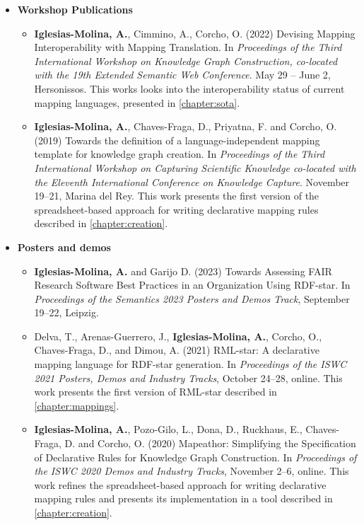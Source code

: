 \begin{itemize}
    \item \textbf{Workshop Publications}
    \begin{itemize}
        \item \textbf{Iglesias-Molina, A.}, Cimmino, A., Corcho, O. (2022) Devising Mapping Interoperability with Mapping Translation. In \textit{Proceedings of the Third International Workshop on Knowledge Graph Construction, co-located with the 19th Extended Semantic Web Conference}. May 29 -- June 2, Hersonissos. This works looks into the interoperability status of current mapping languages, presented in \cref{chapter:sota}.
        
        \item \textbf{Iglesias-Molina, A.}, Chaves-Fraga, D., Priyatna, F. and Corcho, O. (2019) Towards the definition of a language-independent mapping template for knowledge graph creation. In \textit{Proceedings of the Third International Workshop on Capturing Scientific Knowledge co-located with the Eleventh International Conference on Knowledge Capture}. November 19--21, Marina del Rey. This work presents the first version of the spreadsheet-based approach for writing declarative mapping rules described in \cref{chapter:creation}.
    \end{itemize}
\end{itemize}

\begin{itemize}
    \item \textbf{Posters and demos}
    \begin{itemize}
        \item \textbf{Iglesias-Molina, A.} and Garijo D. (2023) Towards Assessing FAIR Research Software Best Practices in an Organization Using RDF-star. In \textit{Proceedings of the Semantics 2023 Posters and Demos Track}, September 19--22, Leipzig.
        
        \item Delva, T., Arenas-Guerrero, J., \textbf{Iglesias-Molina, A.}, Corcho, O., Chaves-Fraga, D., and Dimou, A. (2021) RML-star: A declarative mapping language for RDF-star generation. In \textit{Proceedings of the ISWC 2021 Posters, Demos and Industry Tracks}, October 24--28, online. This work presents the first version of RML-star described in \cref{chapter:mappings}.
    
        \item \textbf{Iglesias-Molina, A.}, Pozo-Gilo, L., Dona, D., Ruckhaus, E., Chaves-Fraga, D. and Corcho, O. (2020) Mapeathor: Simplifying the Specification of Declarative Rules for Knowledge Graph Construction. In \textit{Proceedings of the ISWC 2020 Demos and Industry Tracks}, November 2--6, online. This work refines the spreadsheet-based approach for writing declarative mapping rules and presents its implementation in a tool described in \cref{chapter:creation}.
    \end{itemize}
\end{itemize}


